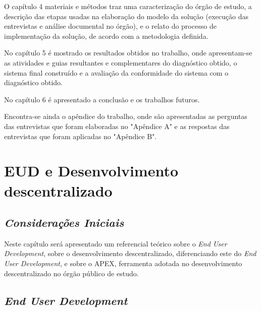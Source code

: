 O capítulo 4 materiais e métodos traz uma caracterização do órgão de estudo, a descrição das etapas usadas na elaboração do modelo da solução (execução das entrevistas e análise documental no órgão), e o relato do processo de implementação da solução, de acordo com a metodologia definida.

No capítulo 5 é mostrado os resultados obtidos no trabalho, onde apresentam-se as atividades e guias resultantes e complementares do diagnóstico obtido, o sistema final construído e a avaliação da conformidade do sistema com o diagnóstico obtido.

No capítulo 6 é apresentado a conclusão e os trabalhos futuros.

Encontra-se ainda o apêndice do trabalho, onde são apresentadas as perguntas das entrevistas que foram elaboradas no "Apêndice A" e as respostas das entrevistas que foram aplicadas no "Apêndice B".

\chapter[EUD e Desenvolvimento descentralizado]{EUD e Desenvolvimento descentralizado}

\section{\textit{Considerações Iniciais}}

Neste capítulo será apresentado um referencial teórico sobre o \textit{End User Development}, sobre o desenvolvimento descentralizado, diferenciando este do \textit{End User Development}, e sobre o APEX, ferramenta adotada no desenvolvimento descentralizado no órgão público de estudo.

\section{\textit{End User Development}}

